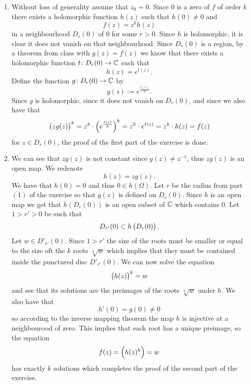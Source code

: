 \documentclass[11pt,a4paper]{article}
\begin{document}
\begin{solution} \phantom{}
\begin{enumerate}
  \item[(1)] Without loss of generality assume that $z_0 = 0$.
    Since $0$ is a zero of $f$ of order $k$ there exists a holomorphic
    function $h(z)$ such that $h(0) \neq 0$ and
    \[
      f(z) = z^k h(z)
    \]
    in a neighbourhood $D_r(0)$ of $0$ for some $r > 0$.
    Since $h$ is holomorphic, it is clear it does not vanish on that
    neighbourhood.
    Since $D_r(0)$ is a region,
    by a theorem from class with $g(z) = f (z)$
    we know that there exists a holomorphic function
    $t \colon D_r(0) \to \mathbb{C}$ such that
    \[
      h(z) = e^{t(z)}.
    \]
    Define the function $g \colon D_r(0) \to \mathbb{C}$ by
    \[
      g(z) := e^{\frac{t(z)}{k}}.
    \]
    Since $g$ is holomorphic, since it does not vanish on $D_r(0)$,
    and since we also have that
    \[
      \del{z g(z)}^k =
      z^k \cdot \del{e^{\frac{t(z)}{k}}}^k =
      z^k \cdot e^{t(z)} =
      z^k \cdot h(z) = f(z)
    \]
    for $z \in D_r(0)$, the proof of the first part of the exercise is done.
  \item[(2)] We can see that $z g(z)$ is not constant since
    $g(z) \neq z^{-1}$, thus $z g(z)$ is an open map.
    We redenote
    \[
      h(z) = z g(z).
    \]
    We have that $h(0) = 0$ and thus $0 \in h(\Omega)$.
    Let $r$ be the radius from part $(1)$ of the exercise
    so that $g(z)$ is defined on $D_r(0)$.
    Since $h$ is an open map we get that $h(D_r(0))$ is an open subset of
    $\mathbb{C}$ which contains $0$.
    Let $1 > r' > 0$ be such that
    \[
      D_{r'}(0) \subset h\del{D_{r}(0)}.
    \]
    Let $w \in D'_{r'}(0)$.
    Since $1 > r'$ the size of the roots must be smaller or equal to the size
    oft the $k$ roots $\sqrt[k] w$ which implies that they must be
    contained inside the punctured disc $ D'_{r'}(0)$.
    We can now solve the equation
    \[
      \del{h(z)}^k = w
    \]
    and see that its solutions are the preimages of the roots $\sqrt[k] w$
    under $h$.
    We also have that
    \[
      h'(0) = g(0) \neq 0
    \]
    so according to the inverse mapping theorem the map $h$ is injective
    at a neighbourood of zero.
    This implies that each root has a unique preimage, so the equation
    \[
      f(z) = \del{h(z)^k} = w
    \]
    has exactly $k$ solutions which completes the proof of the second
    part of the exercise.
\end{enumerate}
\end{solution}
\end{document}
